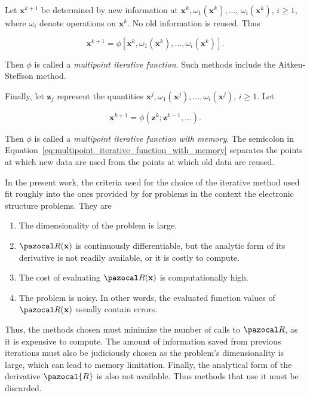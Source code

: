 Let \(\mathbf x^{k+1}\) be determined by new information at \(\mathbf x^{k}, \omega_{1}\left(\mathbf x^{k}\right), \ldots\), \(\omega_{i}\left(\mathbf x^{k}\right)\), \(i \geq 1\), where \(\omega_i\) denote operations on \(\mathbf x^k\).
No old information is reused.
Thus
\begin{highlight}
  \begin{equation}
    \mathbf x^{k+1}=\phi\left[\mathbf x^{k}, \omega_{1}\left(\mathbf x^{k}\right), \ldots, \omega_{i}\left(\mathbf x^{k}\right)\right].
  \end{equation}
\end{highlight}
Then \(\phi\) is called a \textit{multipoint iterative function}.
Such methods include the Aitken-Steffson method.

Finally, let \(\mathbf z_{j}\) represent the quantities \(\mathbf x^{j}, \omega_{1}\left(\mathbf x^{j}\right), \ldots, \omega_{i}\left(\mathbf x^{j}\right)\), \(i \geq 1\).
Let
\begin{highlight}
  \begin{equation} \label{eq:multipoint_iterative_function_with_memory}
  \mathbf x^{k+1}=\phi\left(\mathbf z^{k} ; \mathbf z^{k-1}, \dots \right) .
  \end{equation}
\end{highlight}
Then \(\phi\) is called a \textit{multipoint iterative function with memory}.
The semicolon in Equation~\eqref{eq:multipoint_iterative_function_with_memory} separates the points at which new data are used from the points at which old data are reused.

In the present work, the criteria used for the choice of the iterative method used fit roughly into the ones provided by \cite{fang_two_2009} for problems in the context the electronic structure problems.
They are
\begin{enumerate}
  \item The dimensionality of the problem is large.
  \item \(\pazocal R(\mathbf x)\) is continuously differentiable, but the analytic form of its derivative is not readily available, or it is costly to compute.
  \item The cost of evaluating \(\pazocal R(\mathbf x)\) is computationally high.
  \item The problem is noisy. In other words, the evaluated function values of \(\pazocal R(\mathbf x)\) usually contain errors.
\end{enumerate}
Thus, the methods chosen must minimize the number of calls to \(\pazocal R\), as it is expensive to compute.
The amount of information saved from previous iterations must also be judiciously chosen as the problem's dimensionality is large, which can lead to memory limitation.
Finally, the analytical form of the derivative \(\pazocal{R}\) is also not available.
Thus methods that use it must be discarded.


